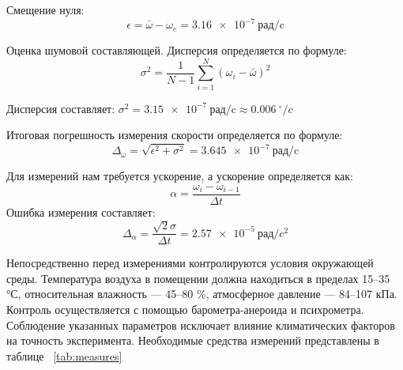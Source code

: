 Смещение нуля:
\begin{equation}
	\epsilon
	= \bar{\omega} - \omega_e = \SI{3,16 e-7}{\text{рад/c}}
	\label{eq:omega_correct}
\end{equation}

Оценка шумовой составляющей. Дисперсия определяется по формуле:
\begin{equation}
	\sigma^2=\frac{1}{N-1}\sum_{i=1}^N(\omega_i-\bar{\omega})^2
	\label{eq:disperssion}
\end{equation}

Дисперсия составляет: $\sigma^2=\SI{3,15 e-7}{\text{рад/c}} \approx \SI{0,006}{^\circ /c}$

Итоговая погрешность измерения скорости определяется по формуле:
\begin{equation}
	\Delta_{\omega}=\sqrt{\epsilon^2+\sigma^2}=\SI{3,645 e-7}{\text{рад/c}}
	\label{eq:rmse}
\end{equation}

Для измерений нам требуется ускорение, а ускорение определяется как:
\begin{equation}
	\alpha =\frac{\omega_i-\omega_{i-1}}{\Delta t}
	\label{eq:acc}
\end{equation}
Ошибка измерения составляет:
\begin{equation}
	\Delta_\alpha = \frac{\sqrt{2}\sigma}{\Delta t} = \SI{2,57 e-5}{\text{рад}/c^2}
	\label{eq:rmse_a}
\end{equation}







Непосредственно перед измерениями контролируются условия окружающей среды. Температура воздуха в помещении должна находиться в пределах 15–35 °С, относительная влажность — 45–80 \%, атмосферное давление — 84–107 кПа. Контроль осуществляется с помощью барометра-анероида и психрометра. Соблюдение указанных параметров исключает влияние климатических факторов на точность эксперимента. Необходимые средства измерений представлены в таблице ~\cref{tab:measures}

\begingroup
\small
\captionsetup[table]{skip=7pt}

